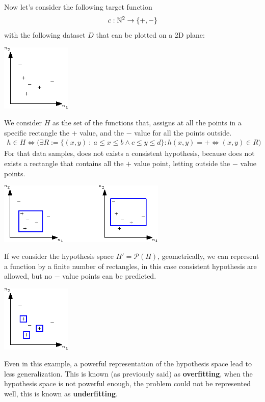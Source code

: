 \documentclass[10pt, letterpaper]{report}
\begin{document}
Now let's consider the following target function\begin{equation}
	c:{\mathbb N}^2\rightarrow\{+,-\}
\end{equation}
with the following dataset $D$ that can be plotted on a 2D plane:\begin{center}
	\includegraphics[width=0.25\textwidth]{images/N2_hypothesis_1.eps}
\end{center}
We consider $H$ as the set of the functions that, assigns at all the points in a specific rectangle the $+$ value, and the $-$ value for all the points outside.
\begin{eqnarray*}
	h\in H \iff\Big( \exists R:=\{(x,y) \ : \ a\le x\le b\land c\le y\le d\} : h(x,y)=+\iff (x,y)\in R\Big )
\end{eqnarray*}
For that data samples, does not exists a consistent hypothesis, because does not exists a rectangle that contains all the $+$ value point, letting outside the $-$ value points.
\begin{center}
	\includegraphics[width=0.6\textwidth]{images/N2_hypothesis_2.eps}
\end{center}
If we consider the hypothesis space $H'=\mathcal P(H)$, geometrically, we can represent a function by a finite number of rectangles, in this case consistent hypothesis are allowed, but no $-$ value points can be predicted.
\begin{center}
	\includegraphics[width=0.25\textwidth]{images/N2_hypothesis_3.eps}
\end{center}
Even in this example, a powerful representation of the hypothesis space lead to less generalization. This is known (as previously said) as \textbf{overfitting}, when the hypothesis space is not powerful enough, the problem could not be represented well, this is known as \textbf{underfitting}.\bigskip
\end{document}
